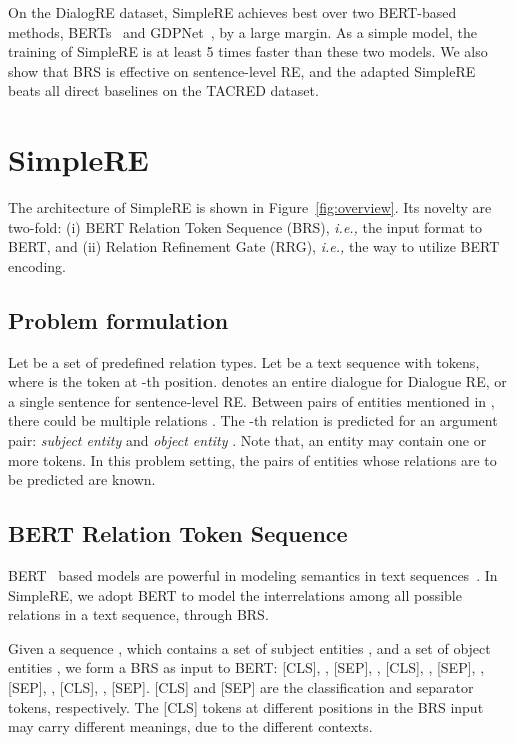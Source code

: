 \documentclass{article}
\newcommand{\ie}{\emph{i.e.,}\xspace}
\begin{document}
On the DialogRE dataset, SimpleRE achieves  best  over two BERT-based methods, BERTs~\cite{yu-etal-2020-dialogue} and GDPNet~\cite{xue2020gdpnet}, by a large margin. As a simple model, the training of SimpleRE is at least 5 times faster than these two models. We also show that BRS is effective on sentence-level RE, and the adapted SimpleRE beats all direct baselines on the TACRED dataset. 

\section{S\lowercase{imple}RE}\label{sec:method}
The  architecture of SimpleRE is shown in Figure~\ref{fig:overview}. Its novelty are two-fold: (i) BERT Relation Token Sequence (BRS), \ie the input format to BERT,  and (ii) Relation Refinement Gate (RRG), \ie the way to utilize BERT encoding. 
 
\subsection{Problem formulation}
Let  be a set of predefined relation types. Let  be a text sequence with  tokens, where  is the token at -th position.  denotes an entire dialogue for Dialogue RE, or a single sentence for sentence-level RE. Between  pairs of entities mentioned in , there could be multiple relations . The -th relation  is predicted for an argument pair: \textit{subject entity}  and \textit{object entity} . Note that, an entity may contain one or more tokens. In this problem setting, the pairs of entities whose relations are to be predicted are known.  

\subsection{BERT Relation Token Sequence}
BERT~\cite{devlin-etal-2019-bert} based models are powerful in modeling semantics in text sequences~\cite{10.1145/3357384.3358028,10.1145/3397271.3401309,Su2020VL-BERT:}. In SimpleRE, we adopt BERT to model the interrelations among all possible relations in a text sequence, through BRS.

Given a sequence , which contains a set of subject entities , and a set of object entities , we form a BRS as input to BERT: [CLS], , [SEP], , [CLS], , [SEP], , [SEP], , [CLS], , [SEP]. [CLS] and [SEP] are the classification and separator tokens, respectively. The [CLS] tokens at different positions in the BRS input may carry different meanings, due to the different contexts.
\end{document}
